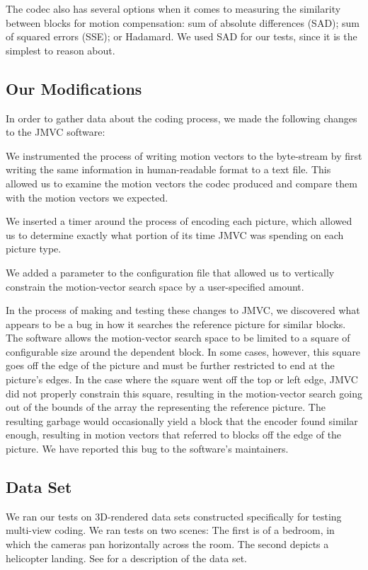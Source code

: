 \documentclass{sig-alternate-05-2015}
\begin{document}
The codec also has several options when it comes to measuring the similarity
between blocks for motion compensation: sum of absolute differences (SAD); sum
of squared errors (SSE); or Hadamard. We used SAD for our tests, since it is
the simplest to reason about.

\subsection{Our Modifications} %
\label{subsec:modifications} %
In order to gather data about the coding process, we made the following changes
to the JMVC software: \begin{compactenum}
\item We instrumented the process of writing motion vectors to the byte-stream
by first writing the same information in human-readable format to a text file.
This allowed us to examine the motion vectors the codec produced and compare
them with the motion vectors we expected.
\item We inserted a timer around the process of encoding each picture, which
allowed us to determine exactly what portion of its time JMVC was spending on
each picture type.
\item We added a parameter to the configuration file that allowed us to
vertically constrain the motion-vector search space by a user-specified amount.
\end{compactenum}

In the process of making and testing these changes to JMVC, we discovered what
appears to be a bug in how it searches the reference picture for similar blocks.
The software allows the motion-vector search space to be limited to a square of
configurable size around the dependent block. In some cases, however, this
square goes off the edge of the picture and must be further restricted to end
at the picture's edges. In the case where the square went off the top or left
edge, JMVC did not properly constrain this square, resulting in the
motion-vector search going out of the bounds of the array the representing the
reference picture. The resulting garbage would occasionally yield a block that
the encoder found similar enough, resulting in motion vectors that referred to
blocks off the edge of the picture. We have reported this bug to the software's
maintainers.

\subsection{Data Set} %
\label{subsec:data-set} %
We ran our tests on 3D-rendered data sets constructed specifically for testing
multi-view coding. We ran tests on two scenes: The first is of a bedroom, in
which the cameras pan horizontally across the room. The second depicts a
helicopter landing. See \cite{zhang:multi} for a description of the data set.
\end{document}
